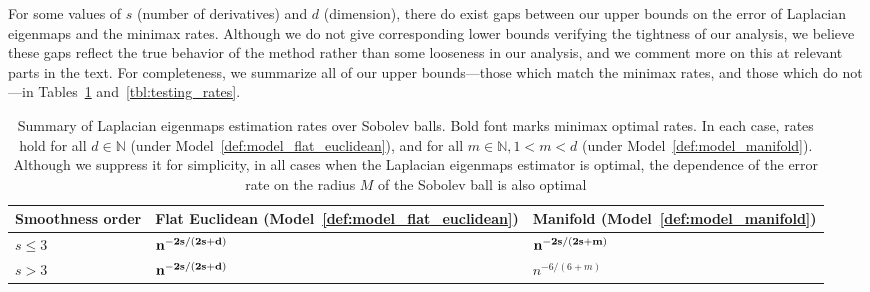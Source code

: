 \documentclass[aos]{imsart}
\theoremstyle{plain}
\theoremstyle{definition}
\theoremstyle{remark}
\newcommand{\1}{\mathbf{1}}
\begin{document}
For some values of $s$ (number of derivatives) and $d$ (dimension), there do exist gaps between our upper bounds on the error of Laplacian eigenmaps and the minimax rates. Although we do not give corresponding lower bounds verifying the tightness of our analysis, we believe these gaps reflect the true behavior of the method rather than some looseness in our analysis, and we comment more on this at relevant parts in the text. For completeness, we summarize all of our upper bounds---those which match the minimax rates, and those which do not---in Tables~\ref{tbl:estimation_rates} and~\ref{tbl:testing_rates}.
\begin{table}
	\begin{center}
		\begin{tabular}{p{} | p{} p{} }
			Smoothness order & Flat Euclidean (Model~\ref{def:model_flat_euclidean}) & Manifold (Model~\ref{def:model_manifold}) \\
			\hline
			$s \leq 3$ & ${\bf n^{-2s/(2s + d)}}$ & ${\bf n^{-2s/(2s + m)}}$ \\
			$s > 3$  & ${\bf n^{-2s/(2s + d)}}$ & $n^{-6/(6 + m)}$
		\end{tabular}
	\end{center}
	\caption{Summary of Laplacian eigenmaps estimation rates over Sobolev balls. Bold font marks minimax optimal rates. In each case, rates hold for all $d \in \mathbb{N}$ (under Model~\ref{def:model_flat_euclidean}), and for all $m \in \mathbb{N}, 1 < m < d$ (under Model~\ref{def:model_manifold}). Although we suppress it for simplicity, in all cases when the Laplacian eigenmaps estimator is optimal, the dependence of the error rate on the radius $M$ of the Sobolev ball is also optimal}
	\label{tbl:estimation_rates}
\end{table}
\end{document}
